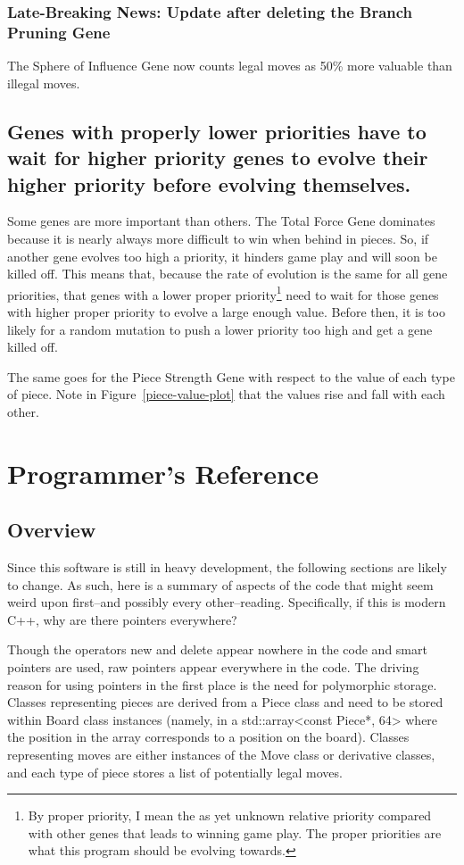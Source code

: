 \documentclass[letterpaper]{article}
\newcommand{\cpp}{C{\nobreak +}{\nobreak +}}
\newcommand{\code}[1]{\textsf{#1}}
\renewcommand{\_}{\allowbreak\textunderscore\allowbreak}
\begin{document}
\subsubsection{Late-Breaking News: Update after deleting the Branch Pruning Gene}
The Sphere of Influence Gene now counts legal moves as 50\% more valuable than illegal moves.

\subsection{Genes with properly lower priorities have to wait for higher priority genes to evolve their higher priority before evolving themselves.}
\label{lower-priority-waits}

Some genes are more important than others. The Total Force Gene dominates because it is nearly always more difficult to win when behind in pieces. So, if another gene evolves too high a priority, it hinders game play and will soon be killed off. This means that, because the rate of evolution is the same for all gene priorities, that genes with a lower proper priority\footnote{By proper priority, I mean the as yet unknown relative priority compared with other genes that leads to winning game play. The proper priorities are what this program should be evolving towards.} need to wait for those genes with higher proper priority to evolve a large enough value. Before then, it is too likely for a random mutation to push a lower priority too high and get a gene killed off.

The same goes for the Piece Strength Gene with respect to the value of each type of piece. Note in Figure~\ref{piece-value-plot} that the values rise and fall with each other.

\section{Programmer's Reference}

\subsection{Overview}

Since this software is still in heavy development, the following sections are likely to change. As such, here is a summary of aspects of the code that might seem weird upon first--and possibly every other--reading. Specifically, if this is modern \cpp{}, why are there pointers everywhere?

Though the operators \code{new} and \code{delete} appear nowhere in the code and smart pointers are used, raw pointers appear everywhere in the code. The driving reason for using pointers in the first place is the need for polymorphic storage. Classes representing pieces are derived from a \code{Piece} class and need to be stored within \code{Board} class instances (namely, in a \code{std::array<const Piece*, 64>} where the position in the array corresponds to a position on the board). Classes representing moves are either instances of the \code{Move} class or derivative classes, and each type of piece stores a list of potentially legal moves.
\end{document}
